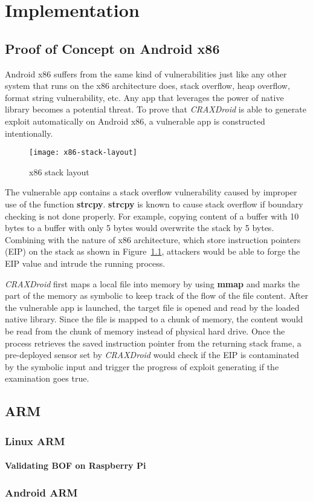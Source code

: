 \chapter{Implementation}

\section{Proof of Concept on Android x86}

Android x86 suffers from the same kind of vulnerabilities just like any other
system that runs on the x86 architecture does, stack overflow, heap overflow,
format string vulnerability, etc. Any app that leverages the power of native
library becomes a potential threat. To prove that \emph{CRAXDroid} is able to
generate exploit automatically on Android x86, a vulnerable app is constructed
intentionally.

\begin{figure}[!ht]
  \texttt{[image: x86-stack-layout]}
  \caption{x86 stack layout}
  \label{fig:x86-stack-layout}
\end{figure}

The vulnerable app contains a stack overflow vulnerability caused by improper
use of the function \textbf{strcpy}. \textbf{strcpy} is known to cause
stack overflow if boundary checking is not done properly. For example, copying
content of a buffer with 10 bytes to a buffer with only 5 bytes would overwrite
the stack by 5 bytes. Combining with the nature of x86 architecture, which
store instruction pointers (EIP) on the stack as shown in
Figure~\ref{fig:x86-stack-layout}, attackers would be able to forge the EIP
value and intrude the running process.

\emph{CRAXDroid} first maps a local file into memory by using \textbf{mmap} and
marks the part of the memory as symbolic to keep track of the flow of the file
content. After the vulnerable app is launched, the target file is opened and
read by the loaded native library. Since the file is mapped to a chunk of
memory, the content would be read from the chunk of memory instead of physical
hard drive. Once the process retrieves the saved instruction pointer from the
returning stack frame, a pre-deployed sensor set by \emph{CRAXDroid} would
check if the EIP is contaminated by the symbolic input and trigger the
progress of exploit generating if the examination goes true.

\section{ARM}
\subsection{Linux ARM}
\subsubsection{Validating BOF on Raspberry Pi}

\subsection{Android ARM}

